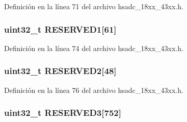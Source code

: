 Definición en la línea 71 del archivo hsadc\+\_\+18xx\+\_\+43xx.\+h.

\subsubsection[{\texorpdfstring{R\+E\+S\+E\+R\+V\+E\+D1}{RESERVED1}}]{\setlength{\rightskip}{0pt plus 5cm}uint32\+\_\+t R\+E\+S\+E\+R\+V\+E\+D1\mbox{[}61\mbox{]}}\hypertarget{struct_l_p_c___h_s_a_d_c___t_a84f2c6998a2176c0569105c2f1bd98f0}{}\label{struct_l_p_c___h_s_a_d_c___t_a84f2c6998a2176c0569105c2f1bd98f0}


Definición en la línea 74 del archivo hsadc\+\_\+18xx\+\_\+43xx.\+h.

\subsubsection[{\texorpdfstring{R\+E\+S\+E\+R\+V\+E\+D2}{RESERVED2}}]{\setlength{\rightskip}{0pt plus 5cm}uint32\+\_\+t R\+E\+S\+E\+R\+V\+E\+D2\mbox{[}48\mbox{]}}\hypertarget{struct_l_p_c___h_s_a_d_c___t_ab15d2c602a9db2c5cd31a6700221f993}{}\label{struct_l_p_c___h_s_a_d_c___t_ab15d2c602a9db2c5cd31a6700221f993}


Definición en la línea 76 del archivo hsadc\+\_\+18xx\+\_\+43xx.\+h.

\subsubsection[{\texorpdfstring{R\+E\+S\+E\+R\+V\+E\+D3}{RESERVED3}}]{\setlength{\rightskip}{0pt plus 5cm}uint32\+\_\+t R\+E\+S\+E\+R\+V\+E\+D3\mbox{[}752\mbox{]}}\hypertarget{struct_l_p_c___h_s_a_d_c___t_af0f9d49ab8930af430fefd8024b38f87}{}\label{struct_l_p_c___h_s_a_d_c___t_af0f9d49ab8930af430fefd8024b38f87}


